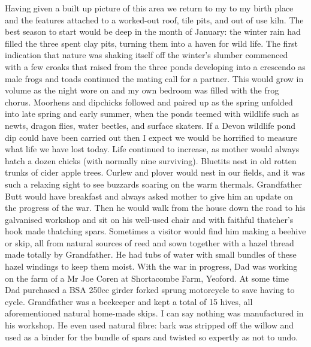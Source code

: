 Having given a built up picture of this area we return to my to my birth place
and the features attached to a worked-out roof, tile pits, and out of use kiln.
The best season to start would be deep in the month of January: the winter rain
had filled the three spent clay pits, turning them into a haven for wild life.
The first indication that nature was shaking itself off the winter's slumber
commenced with a few croaks that raised from the three ponds developing into a
crescendo as male frogs and toads continued the mating call for a partner. This
would grow in volume as the night wore on and my own bedroom was filled with
the frog chorus. Moorhens and dipchicks followed and paired up as the spring
unfolded into late spring and early summer, when the ponds teemed with wildlife
such as newts, dragon flies, water beetles, and surface skaters. If a Devon
wildlife pond dip could have been carried out then I expect we would be
horrified to measure what life we have lost today. Life continued to increase,
as mother would always hatch a dozen chicks (with normally nine surviving).
Bluetits nest in old rotten trunks of cider apple trees. Curlew and plover
would nest in our fields, and it was such a relaxing sight to see buzzards
soaring on the warm thermals. Grandfather Butt would have breakfast and always
asked mother to give him an update on the progress of the war. Then he would
walk from the house down the road to his galvanised workshop and sit on his
well-used chair and with faithful thatcher's hook made thatching spars.
Sometimes a visitor would find him making a beehive or skip, all from natural
sources of reed and sown together with a hazel thread made totally by
Grandfather. He had tubs of water with small bundles of these hazel windings to
keep them moist. With the war in progress, Dad was working on the farm of a Mr
Joe Coren at Shortacombe Farm, Yeoford. At some time Dad purchased a BSA 250cc
girder forked sprung motorcycle to save having to cycle. Grandfather was a
beekeeper and kept a total of 15 hives, all aforementioned natural home-made
skips. I can say nothing was manufactured in his workshop. He even used natural
fibre: bark was stripped off the willow and used as a binder for the bundle of
spars and twisted so expertly as not to undo.
